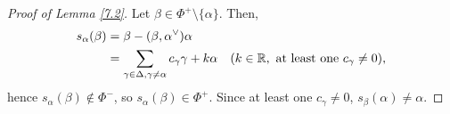 \begin{proof}[Proof of Lemma \ref{7.2}]
Let $\beta \in \Phi^+ \setminus \{\alpha\}$. Then,
\begin{align*}
    s_\alpha(\beta) &= \beta - (\beta, \alpha^\vee) \alpha \\
    &= \sum_{\gamma \in \Delta, \gamma \neq \alpha}
        c_{\gamma} \gamma + k\alpha    \quad (k \in \mathbb{R}, \textrm{ at least one } c_\gamma \neq 0),
\end{align*}
hence $s_\alpha(\beta) \not\in \Phi^-$, so $s_\alpha(\beta) \in \Phi^+$. Since
at least one $c_\gamma \neq 0$, $s_\beta(\alpha) \neq \alpha$.
\end{proof}
